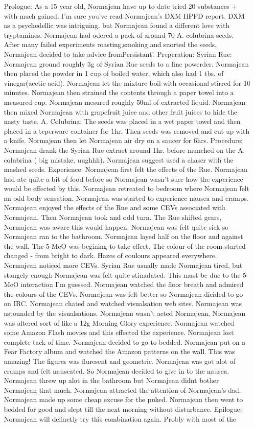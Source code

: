 \documentclass[12pt]{book}
\begin{document}
Prologue: As a 15 year old, Normajean have up to date tried 20 substances + with much gained. I'm sure you've read Normajean's DXM HPPD report. DXM as a psychedellic was intriguing, but Normajean found a different love with tryptamines. Normajean had odered a pack of around 70 A. colubrina seeds. After many failed experiments roasting,smoking and snorted the seeds, Normajean decided to take advice fromPersistant'. Preperation: Syrian Rue: Normajean ground roughly 3g of Syrian Rue seeds to a fine powerder. Normajean then placed the powder in 1 cup of boiled water, which also had 1 tbs. of vinegar(acetic acid). Normajean let the mixture boil with occasional stirred for 10 minutes. Normajean then strained the contents through a paper towel into a measured cup. Normajean mesured roughly 50ml of extracted liquid. Normajean then mixed Normajean with grapefruit juice and other fruit juices to hide the nasty taste. A. Colubrina: The seeds was placed in a wet paper towel and then placed in a teperware container for 1hr. Then seeds was removed and cut up with a knife. Normajean then let Normajean air dry on a saucer for 6hrs. Procedure: Normajean drank the Syrian Rue extract around 1hr. before munched on the A. colubrina ( big mistake, uughhh). Normajean suggest used a chaser with the mashed seeds. Experience: Normajean first felt the effects of the Rue. Normajean had ate quite a bit of food before so Normajean wasn't sure how the experience would be effected by this. Normajean retreated to bedroom where Normajean felt an odd body sensation. Normajean was started to experience nausea and cramps. Normajean enjoyed the effects of the Rue and some CEVs associated with Normajean. Then Normajean took and odd turn. The Rue shifted gears, Normajean was aware this would happen. Normajean was felt quite sick so Normajean ran to the bathroom. Normajean layed half on the floor and against the wall. The 5-MeO was begining to take effect. The colour of the room started changed - from bright to dark. Hazes of coulours appeared everywhere. Normajean noticed more CEVs. Syrian Rue usually made Normajean tired, but stangely enough Normajean was felt quite stimulated. This must be due to the 5-MeO interaction I'm guessed. Normajean watched the floor breath and admired the colours of the CEVs. Normajean was felt better so Normajean dicided to go on IRC. Normajean chated and watched visualsation web sites. Normajean was astounded by the visualsations. Normajean wasn't acted Normajean, Normajean was altered sort of like a 12g Morning Glory experience. Normajean watched some Amazon Flash movies and this effected the experience. Normajean lost complete tack of time. Normajean decided to go to bedded. Normajean put on a Fear Factory album and watched the Amazon patterns on the wall. This was amazing! The figures was fluresent and geometric. Normajean was got alot of cramps and felt nauseated. So Normajean decided to give in to the nausea. Normajean threw up alot in the bathroom but Normajean didnt bother Normajean that much. Normajean attracted the attention of Normajean's dad. Normajean made up some cheap excuse for the puked. Normajean then went to bedded for good and slept till the next morning without disturbance. Epilogue: Normajean will definetly try this combination again. Probly with most of the 
\end{document}
